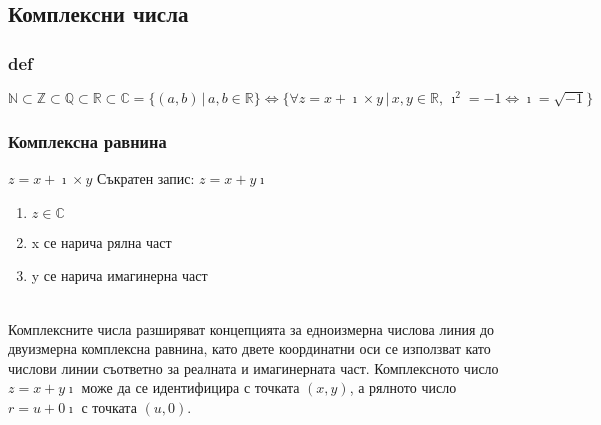 \documentclass{article}
\begin{document}
    \subsection{Комплексни числа}
    \subsubsection{def}
    \(\mathbb{N} \subset \mathbb{Z} \subset \mathbb{Q} \subset \mathbb{R} \subset \mathbb{C} = \{(a,b) \, | \, a, b \in \mathbb{R}\} \iff \{\forall z = x + \imath \times y \, | \, x, y \in \mathbb{R}, \, \imath^2 = -1 \iff \imath = \sqrt{-1}\}\)
    \subsubsection{Комплексна равнина}
    \(z = x + \imath \times y\) \quad Съкратен запис: \(z = x + y \imath\)
    \begin{enumerate}
        \item \(z \in \mathbb{C}\)
        \item x се нарича рялна част
        \item y се нарича имагинерна част
    \end{enumerate}
    \\
    Комплексните числа разширяват концепцията за едноизмерна числова линия до двуизмерна комплексна равнина, като двете координатни оси се използват като числови линии съответно за реалната и имагинерната част. Комплексното число \(z = x + y \imath\) може да се идентифицира с точката \((x, y)\), а рялното число \(r = u + 0 \imath\) с точката \((u, 0)\). 
\end{document}
